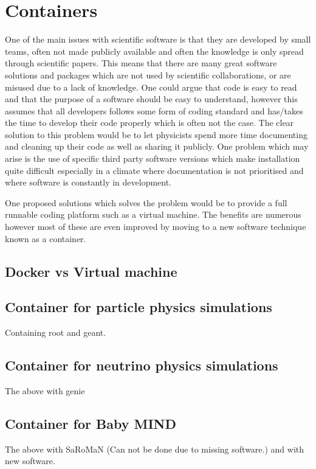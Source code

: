 \section{Containers}
One of the main issues with scientific software is that they are developed by small teams, often not made publicly available and often the knowledge is only spread through scientific papers. This means that there are many great software solutions and packages which are not used by scientific collaborations, or are misused due to a lack of knowledge. One could argue that code is easy to read and that the purpose of a software should be easy to understand, however this assumes that all developers follows some form of coding standard and has/takes the time to develop their code properly which is often not the case. The clear solution to this problem would be to let physicists spend more time documenting and cleaning up their code as well as sharing it publicly. One problem which may arise is the use of specific third party software versions which make installation quite difficult especially in a climate where documentation is not prioritised and where software is constantly in development.

One proposed solutions which solves the problem would be to provide a full runnable coding platform such as a virtual machine. The benefits are numerous however most of these are even improved by moving to a new software technique known as a container.

\subsection{Docker vs Virtual machine}

\subsection{Container for particle physics simulations}
Containing root and geant.

\subsection{Container for neutrino physics simulations}
The above with genie

\subsection{Container for Baby MIND}
The above with SaRoMaN (Can not be done due to missing software.) and with new software. 

